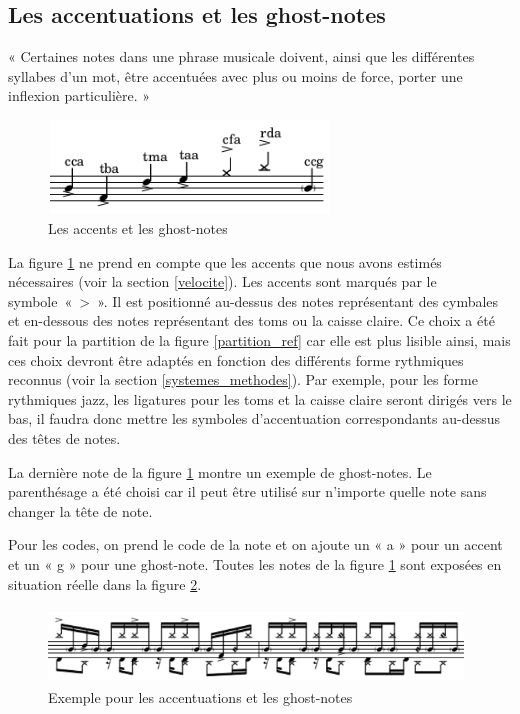 \subsection*{Les accentuations et les ghost-notes}
« Certaines notes dans une phrase musicale doivent, ainsi que les différentes syllabes d’un mot, être accentuées avec plus ou moins de force, porter une inflexion particulière. » \cite{danhauser}
\begin{figure}[h]
	\centering
	\includegraphics[height=25mm, width=75mm]{z_images/3_methodes/0_notation_de_la_batterie/8_accents_et_ghost-notes_0.png}
	\caption{Les accents et les ghost-notes}
	\label{accents_et_gn}
\end{figure}

La figure \ref{accents_et_gn} ne prend en compte que les accents 
que nous avons estimés nécessaires (voir la section \ref{velocite}). 
Les accents sont marqués par le symbole~«~>~». 
Il est positionné au-dessus des notes représentant des cymbales et en-dessous des notes représentant des toms ou la caisse claire. Ce choix a été fait pour la partition de la figure \ref{partition_ref} car elle est plus lisible ainsi, mais ces choix devront être adaptés en fonction des différents forme rythmiques reconnus (voir la section \ref{systemes_methodes}). Par exemple, pour les forme rythmiques jazz, les ligatures pour les toms et la caisse claire seront dirigés vers le bas, il faudra donc mettre les symboles d’accentuation correspondants au-dessus des têtes de notes.

La dernière note de la figure \ref{accents_et_gn} montre un exemple de ghost-notes. 
Le parenthésage a été choisi car il peut être utilisé sur n’importe quelle note sans changer la tête de note.

Pour les codes, 
on prend le code de la note et on ajoute un « a » pour un accent et un « g » pour une ghost-note. Toutes les notes de la figure \ref{accents_et_gn} sont exposées en situation réelle dans la figure \ref{exemple_acc_et_gn}. 
\begin{figure}[h]
	\centering
	\includegraphics[height=20mm, width=110mm]{z_images/3_methodes/0_notation_de_la_batterie/8_accents_et_ghost-notes_1.png}
	\caption{Exemple pour les accentuations et les ghost-notes}
	\label{exemple_acc_et_gn}
\end{figure}
